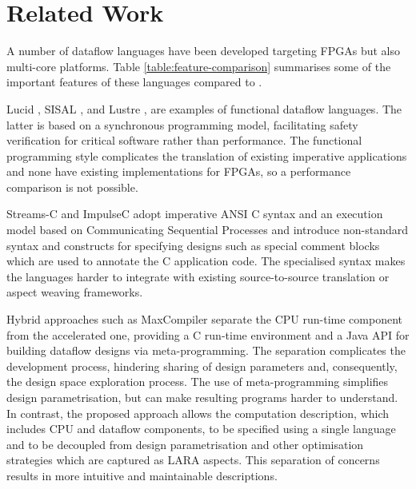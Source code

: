 \section{Related Work}

A number of dataflow languages have been developed targeting FPGAs but
also multi-core platforms. Table \ref{table:feature-comparison}
summarises some of the important features of these languages compared
to \MAXC{}.

Lucid \cite{ashcroft1977lucid}, SISAL \cite{gurd1987implicit},
\cite{mcgraw1983sisal} and Lustre \cite{halbwachs1991synchronous}, are
examples of functional dataflow languages. The latter is based on a
synchronous programming model, facilitating safety verification for
critical software \cite{halbwachs1992programming} rather than
performance. The functional programming style complicates the
translation of existing imperative applications and none have existing
implementations for FPGAs, so a performance comparison is not
possible.

Streams-C\cite{Gokhale:Stone:Arnold:Kalinowski:2000} and
ImpulseC\cite{ImpulseC} adopt imperative ANSI C syntax and an
execution model based on Communicating Sequential Processes and
introduce non-standard syntax and constructs for specifying designs
such as special comment blocks which are used to annotate the C
application code. The specialised syntax makes the languages harder to
integrate with existing source-to-source translation or aspect weaving
frameworks.

Hybrid approaches such as MaxCompiler\cite{5719584} separate the CPU
run-time component from the accelerated one, providing a C run-time
environment and a Java API for building dataflow designs via
meta-programming. The separation complicates the development process,
hindering sharing of design parameters and, consequently, the design
space exploration process. The use of meta-programming simplifies
design parametrisation, but can make resulting programs harder to
understand. In contrast, the proposed approach allows the computation
description, which includes CPU and dataﬂow components, to be speciﬁed
using a single language and to be decoupled from design
parametrisation and other optimisation strategies which are captured
as LARA aspects. This separation of concerns results in more intuitive
and maintainable descriptions.

